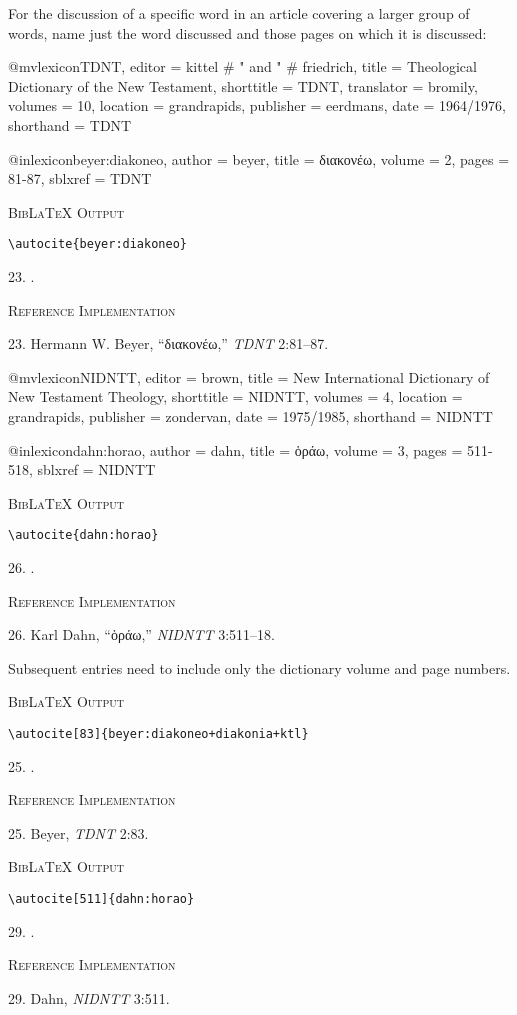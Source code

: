 \documentclass[a4paper]{article}
\newcommand{\gr}[1]{{\greekfont #1}}
\newcommand\citetestlex[2]{%
  {\textsc{BibLaTeX Output}\par
   \nobreak
   \texttt{\textbackslash autocite\{#2\}}\par
   \color{biblatex-colour}
   #1. \cite{#2}.\par}}
\newcommand\citetestlexns[3]{%
  {\textsc{BibLaTeX Output}\par
   \nobreak
   \texttt{\textbackslash autocite[#2]\{#3\}}\par
   \color{biblatex-colour}
   #1. \cite[#2]{#3}.\par}}
\newenvironment{refimp}{%
  \begin{minipage}{\linewidth}
    \setlength{\parskip}{1ex}
    \textsc{Reference Implementation}\par
    \nobreak
    \color{reference-colour}
}{\end{minipage}}
\newenvironment{vb}{%
  \setlength{\parskip}{0pt}
  \verbatim}{\endverbatim}
\begin{document}
\bigskip

For the discussion of a specific word in an article covering a larger group of
words, name just the word discussed and those pages on which it is discussed:

\begin{vb}
@mvlexicon{TDNT,
  editor = kittel # " and " # friedrich,
  title = {Theological Dictionary of the New Testament},
  shorttitle = {TDNT},
  translator = bromily,
  volumes = {10},
  location = grandrapids,
  publisher = eerdmans,
  date = {1964/1976},
  shorthand = {TDNT}
}

@inlexicon{beyer:diakoneo,
  author = beyer,
  title = {\gr{διακονέω}},
  volume = {2},
  pages = {81-87},
  sblxref = {TDNT}
}
\end{vb}

\citetestlex{23}{beyer:diakoneo}

\begin{refimp}
  23. Hermann W. Beyer, “\gr{διακονέω},” \emph{TDNT} 2:81–87.
\end{refimp}

\begin{vb}
@mvlexicon{NIDNTT,
  editor = brown,
  title = {New International Dictionary of New Testament Theology},
  shorttitle = {NIDNTT},
  volumes = {4},
  location = grandrapids,
  publisher = zondervan,
  date = {1975/1985},
  shorthand = {NIDNTT}
}

@inlexicon{dahn:horao,
  author = dahn,
  title = {\gr{ὁράω}},
  volume = {3},
  pages = {511-518},
  sblxref = {NIDNTT}
}
\end{vb}

\citetestlex{26}{dahn:horao}

\begin{refimp}
  26. Karl Dahn, “\gr{ὁράω},” \emph{NIDNTT} 3:511–18.
\end{refimp}

\bigskip

Subsequent entries need to include only the dictionary volume and page
numbers.

\citetestlexns{25}{83}{beyer:diakoneo+diakonia+ktl}

\begin{refimp}
  25. Beyer, \emph{TDNT} 2:83.
\end{refimp}

\citetestlexns{29}{511}{dahn:horao}

\begin{refimp}
  29. Dahn, \emph{NIDNTT} 3:511.
\end{refimp}
\end{document}
